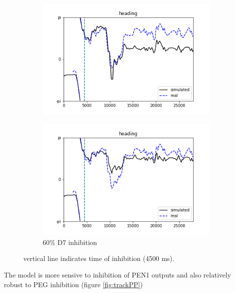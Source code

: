 \documentclass{article}
\begin{document}
\begin{figure}[h]
	\centering
	\begin{subfigure}[t]{0.48\linewidth}
		\centering
		\includegraphics[width = 1.0\linewidth, trim={0 0 0 0}, clip=true]{../figures/sim_head_D7_07.png}
		\label{fig:D730}	
	\end{subfigure}
	\hspace{0.01\linewidth}
	\begin{subfigure}[t]{0.48\linewidth}
		\centering
		\includegraphics[width = 1.0\linewidth, trim={0 0 0 0}, clip=true]{../figures/sim_head_D7_04.png}
		\caption{60\% D7 inhibition}
		\label{fig:D760}
	\end{subfigure}
\caption{vertical line indicates time of inhibition (4500 ms).}
\label{fig:trackD7}
\end{figure}


The model is more sensive to inhibition of PEN1 outputs and also relatively robust to PEG inhibition (figure \ref{fig:trackPP})
\end{document}
